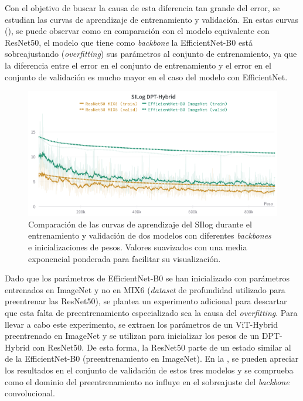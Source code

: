 Con el objetivo de buscar la causa de esta diferencia tan grande del error, se estudian las curvas de aprendizaje de entrenamiento y validación. En estas curvas (), se puede observar como en comparación con el modelo equivalente con ResNet50, el modelo que tiene como \textit{backbone} la EfficientNet-B0 está sobreajustando (\textit{overfitting}) sus parámetros al conjunto de entrenamiento, ya que la diferencia entre el error en el conjunto de entrenamiento y el error en el conjunto de validación es mucho mayor en el caso del modelo con EfficientNet.

\begin{figure}[H]
\centering
\includegraphics[width=0.95\linewidth]{imagenes/Resultados/EfficientNet_overfitting.png} 
\captionsetup{width=.95\linewidth}
\caption{Comparación de las curvas de aprendizaje del SIlog durante el entrenamiento y validación de dos modelos con diferentes \textit{backbones} e inicializaciones de pesos. Valores suavizados con una media exponencial ponderada para facilitar su visualización.}
\label{fig:efficientnet-overfitting}
\end{figure}

Dado que los parámetros de EfficientNet-B0 se han inicializado con parámetros entrenados en ImageNet y no en MIX6 (\textit{dataset} de profundidad utilizado para preentrenar las ResNet50), se plantea un experimento adicional para descartar que esta falta de preentrenamiento especializado sea la causa del \textit{overfitting}. Para llevar a cabo este experimento, se extraen los parámetros de un ViT-Hybrid preentrenado en ImageNet y se utilizan para inicializar los pesos de un DPT-Hybrid con ResNet50. De esta forma, la ResNet50 parte de un estado similar al de la EfficientNet-B0 (preentrenamiento en ImageNet). En la , se pueden apreciar los resultados en el conjunto de validación de estos tres modelos y se comprueba como el dominio del preentrenamiento no influye en el sobreajuste del \textit{backbone} convolucional.

